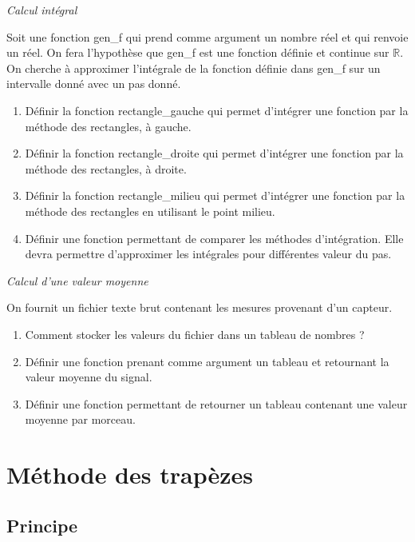 \documentclass[10pt,fleqn]{article} %
\begin{document}
\begin{exemple}
\textit{Calcul intégral}

Soit une fonction \textsf{gen\_f} qui prend comme argument un nombre réel et qui renvoie un réel. On fera l'hypothèse que \textsf{gen\_f} est une fonction définie  et continue sur $\mathbb{R}$. On cherche à approximer l'intégrale de la fonction définie dans \textsf{gen\_f} sur un intervalle donné avec un pas donné. 

\begin{enumerate}
\item Définir la fonction \textsf{rectangle\_gauche} qui permet d'intégrer une fonction par la méthode des rectangles, à gauche.
\item Définir la fonction \textsf{rectangle\_droite} qui permet d'intégrer une fonction par la méthode des rectangles, à droite.
\item Définir la fonction \textsf{rectangle\_milieu} qui permet d'intégrer une fonction par la méthode des rectangles en utilisant le point milieu.
\item Définir une fonction permettant de comparer les méthodes d'intégration. Elle devra permettre d'approximer les intégrales pour différentes valeur du pas. 
\end{enumerate}
\end{exemple}

\begin{exemple}
\textit{Calcul d'une valeur moyenne}

On fournit un fichier texte brut contenant les mesures provenant d'un capteur. 
\begin{enumerate}
\item Comment stocker les valeurs du fichier dans un tableau de nombres ?
\item Définir une fonction prenant comme argument un tableau et retournant la valeur moyenne du signal. 
\item Définir une fonction permettant de retourner un tableau contenant une valeur moyenne par morceau.
\end{enumerate}

\end{exemple}

  
\section{Méthode des trapèzes}
\subsection{Principe}
\end{document}

